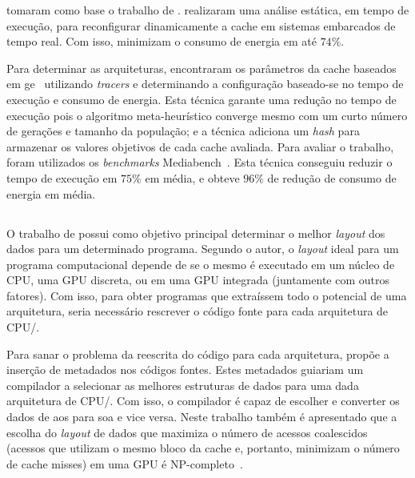  tomaram como base o trabalho de .
 realizaram uma análise estática, em tempo de execução, para reconfigurar dinamicamente a cache em sistemas embarcados de tempo real.
Com isso,  minimizam o consumo de energia em até $74\%$.

Para determinar as arquiteturas,  encontraram os parâmetros da cache baseados em \ac{ge}~\cite{dempsey2009foundations} utilizando \textit{tracers} e determinando a configuração baseado-se no tempo de execução e consumo de energia.
Esta técnica garante uma redução no tempo de execução pois o algoritmo meta-heurístico converge mesmo com um curto número de gerações e tamanho da população; e a técnica adiciona um \textit{hash} para armazenar os valores objetivos de cada cache avaliada.
Para avaliar o trabalho, foram utilizados os \textit{benchmarks} Mediabench~\cite{mediabench1997}.
Esta técnica conseguiu reduzir o tempo de execução em $75\%$ em média, e obteve $96\%$ de redução de consumo de energia em média.

\subsection{}

O trabalho de  possui como objetivo principal determinar o melhor \textit{layout} dos dados para um determinado programa. Segundo o autor, o \textit{layout} ideal para um programa computacional depende de se o mesmo é executado em um núcleo de CPU, uma GPU discreta, ou em uma GPU integrada (juntamente com outros fatores). Com isso, para obter programas que extraíssem todo o potencial de uma arquitetura, seria necessário rescrever o código fonte para cada arquitetura de CPU\@/\@GPU.

Para sanar o problema da reescrita do código para cada arquitetura,  propõe a inserção de metadados nos códigos fontes. Estes metadados guiariam um compilador a selecionar as melhores estruturas de dados para uma dada arquitetura de CPU\@/\@GPU. Com isso, o compilador é capaz de escolher e converter os dados de \ac{aos} para \ac{soa} e vice versa. Neste trabalho também é apresentado que a escolha do \textit{layout} de dados que maximiza o número de acessos coalescidos (acessos que utilizam o mesmo bloco da cache e, portanto, minimizam o número de cache misses) em uma GPU é NP-completo~\cite{wu2013complexity}.

